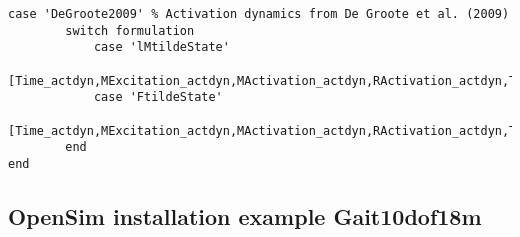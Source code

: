 \documentclass[a4paper,oneside,11pt]{article}
\begin{document}
\begin{lstlisting}[frame=none,basicstyle=\tiny]
    case 'DeGroote2009' % Activation dynamics from De Groote et al. (2009)  
        switch formulation
            case 'lMtildeState'
                [Time_actdyn,MExcitation_actdyn,MActivation_actdyn,RActivation_actdyn,TForcetilde_actdyn,TForce_actdyn,lMtilde_actdyn,lM_actdyn,MuscleNames_actdyn,OptInfo_actdyn,DatStore_actdyn]=SolveMuscleRedundancy_lMtildeState_actdyn(model_path,IK_path,ID_path,time,OutPath,Misc);
            case 'FtildeState'   
                [Time_actdyn,MExcitation_actdyn,MActivation_actdyn,RActivation_actdyn,TForcetilde_actdyn,TForce_actdyn,lMtilde_actdyn,lM_actdyn,MuscleNames_actdyn,OptInfo_actdyn,DatStore_actdyn]=SolveMuscleRedundancy_FtildeState_actdyn(model_path,IK_path,ID_path,time,OutPath,Misc);
        end
end
\end{lstlisting}

\subsection{OpenSim installation example Gait10dof18m}
\label{Example Gait10dof18m}
\end{document}
